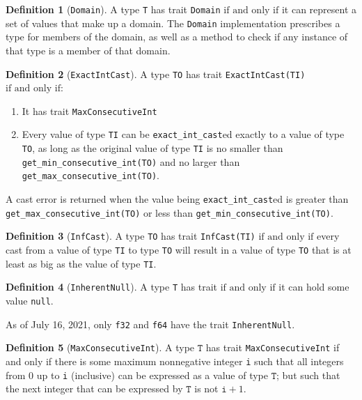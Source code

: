\documentclass[11pt,a4paper]{article}
\theoremstyle{definition}
\newtheorem{definition}{Definition}[section]
\newcommand{\T}{\texttt{T}}
\newcommand{\iffText}{\text{if and only if}}
\begin{document}
\begin{definition}[\texttt{Domain}]
A type \texttt{T} has trait \texttt{Domain} $\iffText$ it can represent a set of values that make up a domain. The \texttt{Domain} implementation prescribes a type for members of the domain, as well as a method to check if any instance of that type is a member of that domain.
\end{definition}

\begin{definition}[\texttt{ExactIntCast}]
    A type \texttt{TO} has trait \texttt{ExactIntCast(TI)} $\iffText$:
    \begin{enumerate}
    \item It has trait \texttt{MaxConsecutiveInt}
    \item Every value of type \texttt{TI} can be \texttt{exact\_int\_cast}ed exactly to a value of type \texttt{TO}, as long as the original value of type \texttt{TI} is no smaller than \texttt{get\_min\_consecutive\_int(TO)} and no larger than \texttt{get\_max\_consecutive\_int(TO)}.
    \end{enumerate}
    
    A cast error is returned when the value being \texttt{exact\_int\_cast}ed is greater than \texttt{get\_max\_consecutive\_int(TO)} or less than \texttt{get\_min\_consecutive\_int(TO)}.
\end{definition}

\begin{definition}[\texttt{InfCast}]
A type \texttt{TO} has trait \texttt{InfCast(TI)} $\iffText$ every cast from a value of type \texttt{TI} to type \texttt{TO} will result in a value of type \texttt{TO} that is at least as big as the value of type \texttt{TI}.
\end{definition}

\begin{definition}[\texttt{InherentNull}]
A type \texttt{T} has trait $\iffText$ it can hold some value \texttt{null}.

As of July 16, 2021, only \texttt{f32} and \texttt{f64} have the trait \texttt{InherentNull}.
\end{definition}

\begin{definition}[\texttt{MaxConsecutiveInt}]
A type $\T$ has trait \texttt{MaxConsecutiveInt} if and only if there is some maximum nonnegative integer \texttt{i} such that all integers from 0 up to \texttt{i} (inclusive) can be expressed as a value of type $\T$; but such that the next integer that can be expressed by $\T$ is not $\texttt{i}+1$.
\end{definition}
\end{document}
